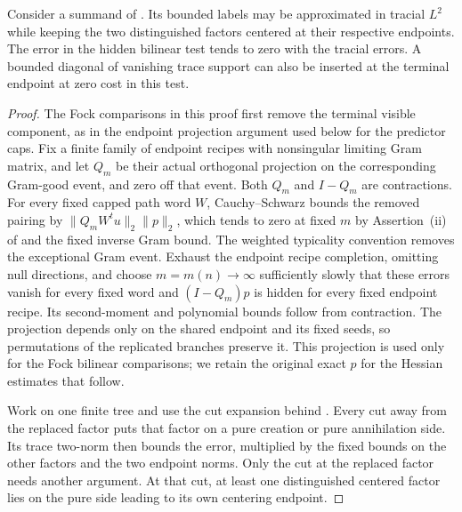 \begin{lemma}
\label{lem:hidden-small-trace}
Consider a summand of . Its
bounded labels may be approximated in tracial $L^2$ while keeping the
two distinguished factors centered at their respective endpoints.
The error in the hidden bilinear test tends to zero with the tracial
errors. A bounded diagonal of vanishing trace support can also be
inserted at the terminal endpoint at zero cost in this test.
\end{lemma}

\begin{proof}
The Fock comparisons in this proof first remove the terminal visible
component, as in the endpoint projection argument used below for the
predictor caps.  Fix a finite family of endpoint recipes with nonsingular
limiting Gram matrix, and let $Q_m$ be their actual orthogonal projection
on the corresponding Gram-good event, and zero off that event.
Both $Q_m$ and $I-Q_m$ are contractions.  For every fixed capped path word
$W$, Cauchy--Schwarz bounds the removed pairing by
$\|Q_mW^tu\|_2\|p\|_2$, which tends to zero at fixed $m$ by
Assertion~\textup{(ii)} of  and the fixed inverse
Gram bound.  The weighted typicality convention removes the exceptional
Gram event.  Exhaust the endpoint recipe completion, omitting null
directions, and choose $m=m(n)\to\infty$ sufficiently slowly that these
errors vanish for every fixed word and $(I-Q_m)p$ is hidden for every
fixed endpoint recipe.  Its second-moment and polynomial bounds follow
from contraction.  The projection depends only on the shared endpoint
and its fixed seeds, so permutations of the replicated branches preserve
it.  This projection is used only for the Fock bilinear comparisons;
we retain the original exact $p$ for the Hessian estimates that follow.

Work on one finite tree and use the cut expansion behind
. Every cut away from the replaced factor
puts that factor on a pure creation or pure annihilation side. Its trace
two-norm then bounds the error, multiplied by the fixed bounds on the
other factors and the two endpoint norms. Only the cut at the replaced
factor needs another argument. At that cut, at least one distinguished
centered factor lies on the pure side leading to its own centering
endpoint.


\end{proof}
